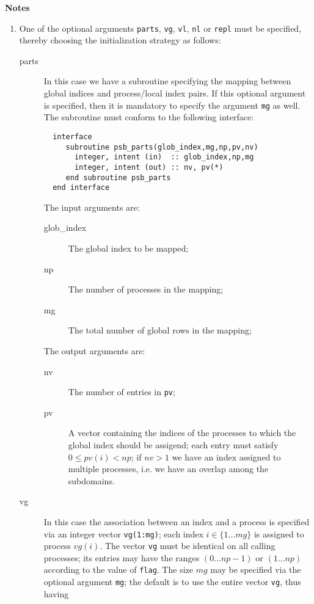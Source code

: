 {\par\noindent\large\bfseries Notes}
\begin{enumerate}
\item One of the optional arguments  \verb|parts|, \verb|vg|,
  \verb|vl|, \verb|nl|  or \verb|repl| must be specified, thereby choosing the
  initialization   strategy as follows:
\begin{description}
\item[parts] In this case we have a subroutine specifying the mapping
  between global indices and process/local index pairs. If this
  optional argument   is specified, then it is mandatory to 
  specify the argument \verb|mg| as well.  
  The subroutine must conform to the following interface: 
\begin{verbatim}
  interface 
     subroutine psb_parts(glob_index,mg,np,pv,nv)
       integer, intent (in)  :: glob_index,np,mg
       integer, intent (out) :: nv, pv(*)
     end subroutine psb_parts
  end interface
\end{verbatim}
  The input arguments are:
  \begin{description}
    \item[glob\_index] The global index to be mapped;
    \item[np] The number of processes in the mapping;
    \item[mg] The total number of global rows in the mapping;
  \end{description}
  The output arguments are:
  \begin{description}
    \item[nv] The number of entries in \verb|pv|;
    \item[pv] A vector containing the indices of the processes to
    which the global index should be assigend; each entry must satisfy
    $0\le pv(i) < np$; if $nv>1$ we have an index assigned to multiple
    processes, i.e. we have an overlap among the subdomains.
  \end{description}
\item[vg] In this case the association between an index and a process
  is specified via an integer vector  \verb|vg(1:mg)|; 
  each index $i \in \{1\dots mg\}$  is assigned to process $vg(i)$. 
  The vector \verb|vg| must be identical on all
  calling processes; its entries may have the ranges $(0\dots np-1)$
  or $(1\dots np)$ according to the value of \verb|flag|.  
  The size $mg$ may be  specified via the optional argument \verb|mg|;
  the default is to use the entire vector \verb|vg|, thus having

\end{description}
\end{enumerate}
